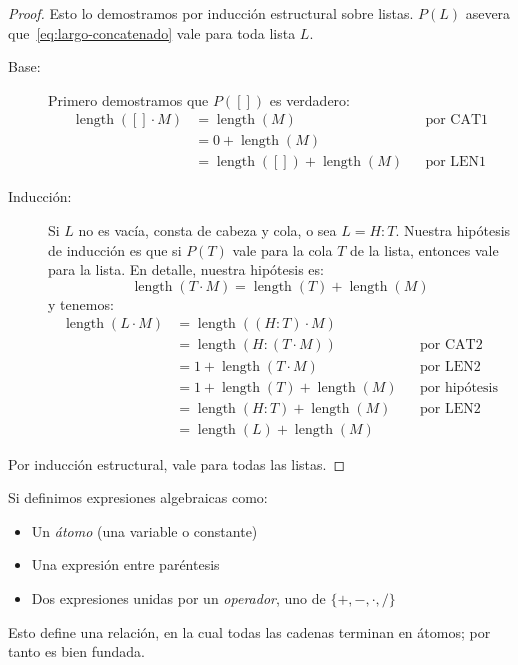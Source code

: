   \begin{proof}
    Esto lo demostramos por inducción estructural sobre listas.
    \(P(L)\) asevera que~\eqref{eq:largo-concatenado}
    vale para toda lista \(L\).
    \begin{description}
    \item[Base:]
      Primero demostramos que \(P([])\) es verdadero:
      \begin{align*}
	\operatorname{length}([] \cdot M)
	&= \operatorname{length}(M)
	   && \text{por CAT1} \\
	&= 0 + \operatorname{length}(M) \\
	&= \operatorname{length}([]) + \operatorname{length}(M)
	   && \text{por LEN1}
      \end{align*}
    \item[Inducción:]
      Si \(L\) no es vacía,
      consta de cabeza y cola,
      o sea \(L = H : T\).
      Nuestra hipótesis de inducción
      es que si \(P(T)\) vale para la cola \(T\) de la lista,
      entonces vale para la lista.
      En detalle,
      nuestra hipótesis es:
      \begin{equation*}
	\operatorname{length}(T \cdot M)
	  = \operatorname{length}(T) + \operatorname{length}(M)
      \end{equation*}
      y tenemos:
      \begin{align*}
	\operatorname{length}(L \cdot M)
	  &= \operatorname{length}((H : T) \cdot M) \\
	  &= \operatorname{length}(H : (T \cdot M))
	     && \text{por CAT2} \\
	  &= 1 + \operatorname{length}(T \cdot M)
	     && \text{por LEN2} \\
	  &= 1 + \operatorname{length}(T) + \operatorname{length}(M)
	     && \text{por hipótesis} \\
	  &= \operatorname{length}(H : T) + \operatorname{length}(M)
	     && \text{por LEN2} \\
	  &= \operatorname{length}(L) + \operatorname{length}(M)
      \end{align*}
    \end{description}
    Por inducción estructural,
    vale para todas las listas.
  \end{proof}

  Si definimos expresiones algebraicas como:
  \begin{itemize}
  \item
    Un \emph{átomo}
    (una variable o constante)
  \item
    Una expresión entre paréntesis
  \item
    Dos expresiones unidas por un \emph{operador},
    uno de \(\{+, -, \cdot, /\}\)%
  \end{itemize}
  Esto define una relación,
  en la cual todas las cadenas terminan en átomos;
  por tanto es bien fundada.

